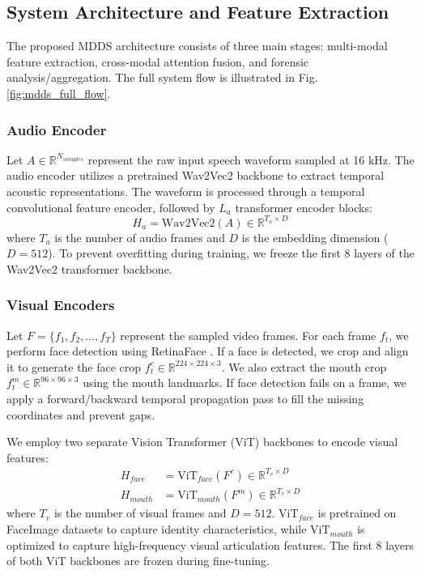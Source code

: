 \documentclass[journal,10pt,onecolumn,draftclsnofoot]{IEEEtran}
\begin{document}
\subsection{System Architecture and Feature Extraction}
The proposed MDDS architecture consists of three main stages: multi-modal feature extraction, cross-modal attention fusion, and forensic analysis/aggregation. The full system flow is illustrated in Fig. \ref{fig:mdds_full_flow}.

\subsubsection{Audio Encoder}
Let $A \in \mathbb{R}^{N_{samples}}$ represent the raw input speech waveform sampled at 16 kHz. The audio encoder utilizes a pretrained Wav2Vec2 backbone to extract temporal acoustic representations. The waveform is processed through a temporal convolutional feature encoder, followed by $L_a$ transformer encoder blocks:
\begin{equation}
    H_a = \text{Wav2Vec2}(A) \in \mathbb{R}^{T_a \times D}
\end{equation}
where $T_a$ is the number of audio frames and $D$ is the embedding dimension ($D = 512$). To prevent overfitting during training, we freeze the first 8 layers of the Wav2Vec2 transformer backbone.

\subsubsection{Visual Encoders}
Let $F = \{f_1, f_2, \dots, f_T\}$ represent the sampled video frames. For each frame $f_t$, we perform face detection using RetinaFace \cite{deng2020retinaface}. If a face is detected, we crop and align it to generate the face crop $f^c_t \in \mathbb{R}^{224 \times 224 \times 3}$. We also extract the mouth crop $f^m_t \in \mathbb{R}^{96 \times 96 \times 3}$ using the mouth landmarks. If face detection fails on a frame, we apply a forward/backward temporal propagation pass to fill the missing coordinates and prevent gaps.

We employ two separate Vision Transformer (ViT) backbones to encode visual features:
\begin{align}
    H_{face} &= \text{ViT}_{face}(F^c) \in \mathbb{R}^{T_v \times D} \\
    H_{mouth} &= \text{ViT}_{mouth}(F^m) \in \mathbb{R}^{T_v \times D}
\end{align}
where $T_v$ is the number of visual frames and $D = 512$. $\text{ViT}_{face}$ is pretrained on FaceImage datasets to capture identity characteristics, while $\text{ViT}_{mouth}$ is optimized to capture high-frequency visual articulation features. The first 8 layers of both ViT backbones are frozen during fine-tuning.
\end{document}
